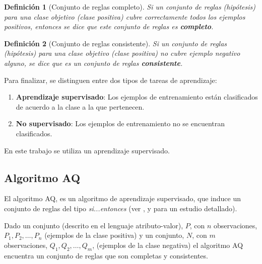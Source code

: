 \documentclass[12pt]{report}
\theoremstyle{break}
\newtheorem{definicion}{Definición}[chapter]
\theoremstyle{break}
\begin{document}
\begin{definicion}[Conjunto de reglas completo]
\label{definicion:reglas-completas}
Si un conjunto de reglas (hipótesis) para una clase objetivo (clase positiva) cubre correctamente todos los ejemplos positivos, entonces se dice que este conjunto de reglas es \textbf{completo}.
\end{definicion}

\begin{definicion}[Conjunto de reglas consistente]
\label{definicion:reglas-consistentes}
Si un conjunto de reglas (hipótesis) para una clase objetivo (clase positiva) no cubre ejemplo negativo alguno, se dice que es un conjunto de reglas \textbf{consistente}.
\end{definicion}

Para finalizar, se distinguen entre dos tipos de tareas de aprendizaje:

\begin{enumerate}
\item \textbf{Aprendizaje supervisado}: Los ejemplos de entrenamiento están clasificados de acuerdo a la clase a la que pertenecen.

\item \textbf{No supervisado}: Los ejemplos de entrenamiento no se encuentran clasificados.
\end{enumerate}

En este trabajo se utiliza un aprendizaje supervisado.


\subsection{Algoritmo AQ}
\label{subseccion:algoritmo aq}
El algoritmo AQ, es un algoritmo de aprendizaje supervisado, que induce un conjunto de reglas del tipo \textit{si...entonces} (ver \cite{AQCervone2010}, \cite{AQMichalski1991} y \cite{AQWojtusiak2012} para un estudio detallado). 

Dado un conjunto (descrito en el lenguaje atributo-valor), $P$, con $n$ observaciones, $P_1, P_2, \ldots, P_n$ (ejemplos de la clase positiva)  y un conjunto, $N$, con $m$ observaciones, $Q_1, Q_2, \ldots, Q_m$, (ejemplos de la clase negativa) el algoritmo AQ encuentra un conjunto de reglas que son completas y consistentes.
\end{document}
